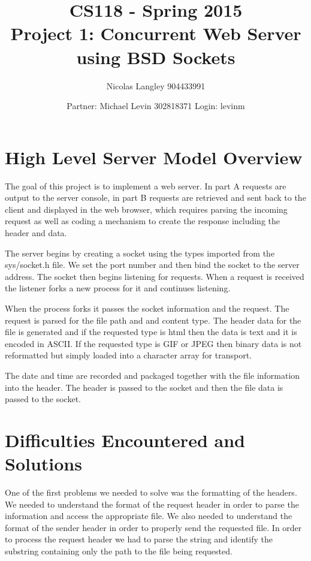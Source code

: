 \documentclass[12pt, titlepage]{article}
\begin{document}
\title{CS118 - Spring 2015 \\
Project 1: Concurrent Web Server using BSD Sockets}
\author{Nicolas Langley 904433991 \and Partner: Michael Levin 302818371 Login: levinm}

\maketitle
\section{High Level Server Model Overview}

The goal of this project is to implement a web server.  In part A requests are output to the server console, in part B requests are retrieved and sent back to the client and displayed in the web browser, which requires parsing the incoming request as well as coding a mechanism to create the response including the header and data.  

The server begins by creating a socket using the types imported from the sys/socket.h file.  We set the port number and then bind the socket to the server address.  The socket then begins listening for requests.  When a request is received the listener forks a new process for it and continues listening.  

When the process forks it passes the socket information and the request.  The request is parsed for the file path and and content type.  The header data for the file is generated and if the requested type is html then the data is text and it is encoded in ASCII.  If the requested type is GIF or JPEG then binary data is not reformatted but simply loaded into a character array for transport.  

The date and time are recorded and packaged together with the file information into the header.  The header is passed to the socket and then the file data is passed to the socket.


\section{Difficulties Encountered and Solutions}

One of the first problems we needed to solve was the formatting of the headers.  We needed to understand the format of the request header in order to parse the information and access the appropriate file.  We also needed to understand the format of the sender header in order to properly send the requested file.  In order to process the request header we had to parse the string and identify the substring containing only the path to the file being requested.  
\end{document}
